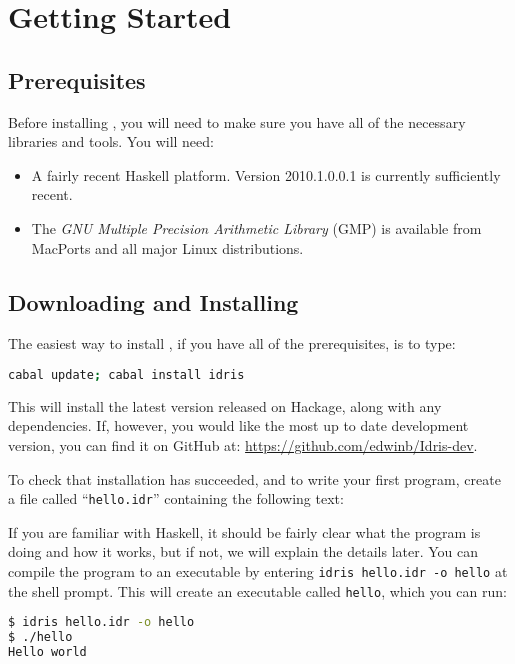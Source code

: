 \section{Getting Started}

\subsection{Prerequisites} 

Before installing \Idris{}, you will need to make sure you have all of the necessary libraries and tools.
You will need:

\begin{itemize}
\item A fairly recent Haskell platform. Version 2010.1.0.0.1 is currently sufficiently recent.
\item The \emph{GNU Multiple Precision Arithmetic Library} (GMP) is available from MacPorts and all major Linux distributions.
\end{itemize}

\subsection{Downloading and Installing}

The easiest way to install \Idris{}, if you have all of the prerequisites, is to type:

\begin{lstlisting}[language=bash]
cabal update; cabal install idris
\end{lstlisting}

\noindent
This will install the latest version released on Hackage, along with any dependencies. 
If, however, you would like the most up to date development version, you can find it on GitHub at: \url{https://github.com/edwinb/Idris-dev}.

To check that installation has succeeded, and to write your first \Idris{} program, create a file called ``\texttt{hello.idr}'' containing the following text:


\noindent
If you are familiar with Haskell, it should be fairly clear what the program is doing and how it works, but if not, we will explain the details later.
You can compile the program to an executable by entering \texttt{idris hello.idr -o hello} at the shell prompt. 
This will create an executable called \texttt{hello}, which you can run:

\begin{lstlisting}[language=bash]
$ idris hello.idr -o hello
$ ./hello
Hello world
\end{lstlisting}

